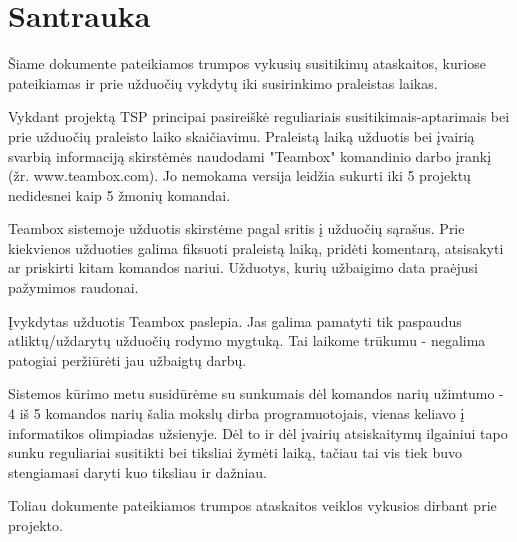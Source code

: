 \section{Santrauka}

	Šiame dokumente pateikiamos trumpos vykusių susitikimų ataskaitos, 
	kuriose pateikiamas ir prie užduočių vykdytų iki susirinkimo praleistas laikas.
	
	Vykdant projektą TSP principai pasireiškė reguliariais susitikimais-aptarimais bei prie užduočių praleisto laiko skaičiavimu.
	Praleistą laiką užduotis bei įvairią svarbią informaciją skirstėmės naudodami "Teambox" komandinio darbo įrankį
	(žr. www.teambox.com). Jo nemokama versija leidžia sukurti iki 5 projektų nedidesnei kaip 5 žmonių komandai.
	
	Teambox sistemoje užduotis skirstėme pagal sritis į užduočių sąrašus. 
	Prie kiekvienos užduoties galima fiksuoti praleistą laiką, pridėti komentarą, atsisakyti ar priskirti kitam komandos nariui.
	Užduotys, kurių užbaigimo data praėjusi pažymimos raudonai.
	
	Įvykdytas užduotis Teambox paslepia. 
	Jas galima pamatyti tik paspaudus atliktų/uždarytų užduočių rodymo mygtuką.
	Tai laikome trūkumu - negalima patogiai peržiūrėti jau užbaigtų darbų.
	
	Sistemos kūrimo metu susidūrėme su sunkumais dėl komandos narių užimtumo - 
	4 iš 5 komandos narių šalia mokslų dirba programuotojais, vienas keliavo į informatikos olimpiadas užsienyje.
	Dėl to ir dėl įvairių atsiskaitymų ilgainiui tapo sunku reguliariai susitikti bei tiksliai žymėti laiką,
	tačiau tai vis tiek buvo stengiamasi daryti kuo tiksliau ir dažniau.
	
	Toliau dokumente pateikiamos trumpos ataskaitos veiklos vykusios dirbant prie projekto.
	